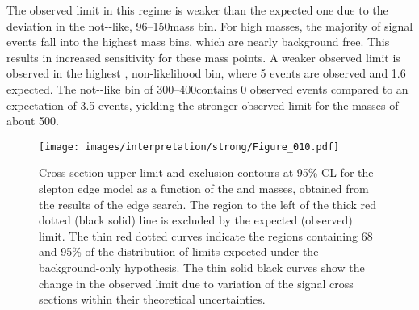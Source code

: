 The observed limit in this regime is weaker than the expected one due to the deviation in the not-\ttbar-like, 96--150\GeV mass bin.
For high \secondchi masses, the majority of signal events fall into the highest mass bins, which are nearly background free. 
This results in increased sensitivity for these mass points. 
A weaker observed limit is observed in the highest \mll, non-\ttbar likelihood bin, where 5 events are observed and 1.6 expected.   
The not-\ttbar-like \mll bin of 300--400\GeV contains 0 observed events compared to an expectation of 3.5 events, yielding the stronger observed limit for the \secondchi masses of about 500\GeV.
\begin{figure}
  \centering
    \texttt{[image: images/interpretation/strong/Figure\_010.pdf]}
    \caption{Cross section upper limit and exclusion contours at 95\% CL for the slepton edge model
      as a function of the \sbottom and \secondchi masses,
      obtained from the results of the edge search.
      The region to the left of the thick red dotted (black solid) line is excluded by the expected (observed) limit.
     The thin red dotted curves indicate the regions containing 68 and 95\% of the distribution of limits
     expected under the background-only hypothesis.
     The thin solid black curves show the change in the observed limit due to
     variation of the signal cross sections within their theoretical uncertainties.
    }
    \label{fig:Limits2}
\end{figure}
